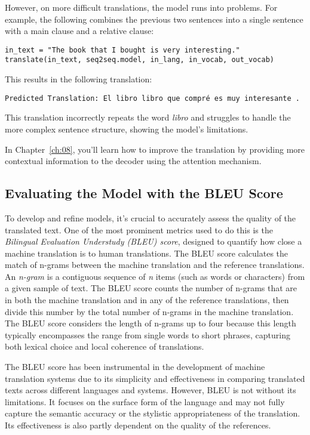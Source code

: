 However, on more difficult translations, the model runs into problems.
For example, the following combines the previous two sentences into a single sentence with a main clause and a relative clause:
\begin{lstlisting}
in_text = "The book that I bought is very interesting."
translate(in_text, seq2seq.model, in_lang, in_vocab, out_vocab)
\end{lstlisting}
This results in the following translation:
\begin{lstlisting}
Predicted Translation: El libro libro que compré es muy interesante .
\end{lstlisting}
This translation incorrectly repeats the word \emph{libro} and struggles to handle the more complex sentence structure, showing the model's limitations.

In Chapter~\ref{ch:08}, you'll learn how to improve the translation by providing more contextual information to the decoder using the attention mechanism.

\subsection{Evaluating the Model with the BLEU Score}

To develop and refine models, it's crucial to accurately assess the quality of the translated text. One of the most prominent metrics used to do this is the \emph{Bilingual Evaluation Understudy (BLEU) score}, designed to quantify how close a machine translation is to human translations.
The BLEU score calculates the match of n-grams between the machine translation and the reference translations. An \emph{n-gram} is a contiguous sequence of \emph{n} items (such as words or characters) from a given sample of text. The BLEU score counts the number of n-grams that are in both the machine translation and in any of the reference translations, then divide this number by the total number of n-grams in the machine translation.
The BLEU score considers the length of n-grams up to four because this length typically encompasses the range from single words to short phrases, capturing both lexical choice and local coherence of translations.

The BLEU score has been instrumental in the development of machine translation systems due to its simplicity and effectiveness in comparing translated texts across different languages and systems. However, BLEU is not without its limitations. It focuses on the surface form of the language and may not fully capture the semantic accuracy or the stylistic appropriateness of the translation. Its effectiveness is also partly dependent on the quality of the references.

